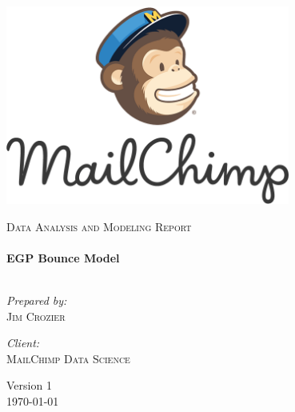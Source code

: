 \begin{titlepage}

\begin{minipage}{0.45\textwidth}
\begin{flushleft}
\includegraphics[width=0.7\textwidth]{./source/shclogo}   
\end{flushleft}
\end{minipage}


\begin{center}




\vspace{4cm}

\textsc{\Large Data Analysis and Modeling Report }\\[0.5cm]


\HRule \\[0.4cm]
{ \huge \bfseries EGP Bounce Model}\\[0.4cm]

\HRule \\[1.5cm]

\begin{minipage}{0.4\textwidth}
\begin{flushleft} \large
\emph{Prepared by:}\\
\textsc{Jim Crozier}
\end{flushleft}
\end{minipage}
\begin{minipage}{0.4\textwidth}
\begin{flushright} \large
\emph{Client:} \\
\textsc{MailChimp Data Science}
\end{flushright}
\end{minipage}

\vfill

\large {Version 1}\\
{\large \today}

\end{center}

\end{titlepage}